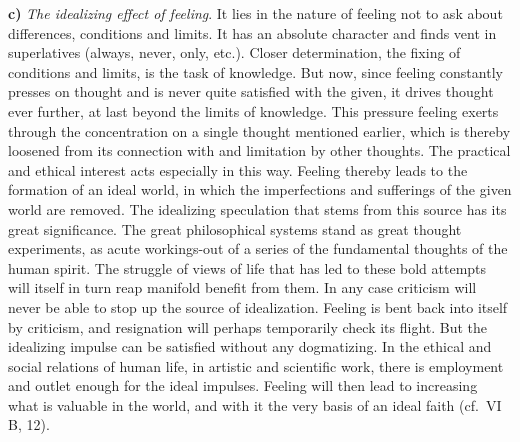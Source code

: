 \documentclass[12pt,a4paper]{book}
\newcommand{\opage}[1]{\marginnote{\footnotesize\textit{[#1]}}}
\begin{document}
\opage{360}\textbf{c)} \emph{The idealizing effect of feeling}. It lies
in the nature of feeling not to ask about differences, conditions and
limits. It has an absolute character and finds vent in superlatives
(always, never, only, etc.). Closer determination, the fixing of
conditions and limits, is the task of knowledge. But now, since feeling
constantly presses on thought and is never quite satisfied with the
given, it drives thought ever further, at last beyond the limits of
knowledge. This pressure feeling exerts through the concentration on a
single thought mentioned earlier, which is thereby loosened from its
connection with and limitation by other thoughts. The practical and
ethical interest acts especially in this way. Feeling thereby leads to
the formation of an ideal world, in which the imperfections and
sufferings of the given world are removed. The idealizing speculation
that stems from this source has its great significance. The great
philosophical systems stand as great thought experiments, as acute
workings-out of a series of the fundamental thoughts of the human
spirit. The struggle of views of life that has led to these bold
attempts will itself in turn reap manifold benefit from them. In any
case criticism will never be able to stop up the source of idealization.
Feeling is bent back into itself by criticism, and resignation will
perhaps temporarily check its flight. But the idealizing impulse can be
satisfied without any dogmatizing. In the ethical and social relations
of human life, in artistic and scientific work, there is employment and
outlet enough for the ideal impulses. Feeling will then lead to
increasing what is valuable in the world, and with it the very basis of
an ideal faith (cf.\ VI B, 12).
\end{document}

